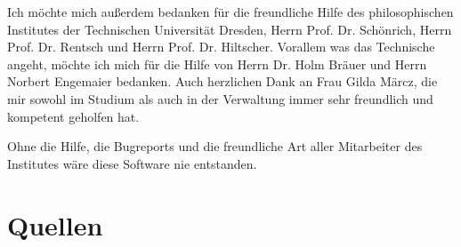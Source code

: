 Ich möchte mich außerdem bedanken für die freundliche Hilfe des philosophischen Institutes der Technischen
Universität Dresden, Herrn Prof. Dr. Schönrich,
Herrn Prof. Dr. Rentsch und Herrn Prof. Dr. Hiltscher. Vorallem was das Technische angeht, möchte ich mich für die 
Hilfe von  Herrn Dr. Holm Bräuer und Herrn Norbert Engemaier bedanken.
Auch herzlichen Dank an Frau Gilda Märcz, die mir sowohl im Studium als auch in der Verwaltung
immer sehr freundlich und kompetent geholfen hat.

Ohne die Hilfe, die Bugreports und die freundliche
Art aller Mitarbeiter des Institutes wäre diese Software nie entstanden.

\theendnotes

\section{Quellen}


\printbibliography[heading=none]


